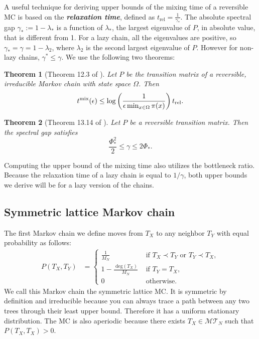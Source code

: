 \documentclass{article}
\newtheorem{theorem}{Theorem}
\begin{document}
A useful technique for deriving upper bounds of the mixing time of a reversible MC is based on the \textit{\textbf{relaxation time}}, defined as $t_{\text{rel}} = \frac{1}{\gamma_*}$. The absolute spectral gap $\gamma_{*}:=1-\lambda_{*}$ is a function of $\lambda_{*}$, the largest eigenvalue of $P$, in absolute value, that is different from 1. For a lazy chain, all the eigenvalues are positive, so $\gamma_* = \gamma=1-\lambda_{2}$, where $\lambda_{2}$ is the second largest eigenvalue of $P$. However for non-lazy chains, $\gamma^* \leq \gamma$. We use the following two theorems: 

\begin{theorem}[Theorem 12.3 of \cite{levin2017markov}] \label{thm:mix_rel_bound}
Let $P$ be the transition matrix of a reversible, irreducible Markov chain with state space $\Omega$. Then \[ t^{\textup{mix}}(\epsilon) \leq \log\left ( \frac{1}{\epsilon \min_{x\in\Omega} \pi(x)} \right) t_{\textup{rel}}. \]
\end{theorem}

\begin{theorem}[Theorem 13.14 of \cite{levin2017markov}] \label{thm:bottleneck_rel_bound}
Let $P$ be a reversible transition matrix. Then the spectral gap satisfies \[ \frac{\Phi_*^2}{2}\leq \gamma \leq 2\Phi_*. \]
\end{theorem}
\noindent Computing the upper bound of the mixing time also utilizes the bottleneck ratio. Because the relaxation time of a lazy chain is equal to $1/\gamma$, both upper bounds we derive will be for a lazy version of the chains.

\subsection{Symmetric lattice Markov chain}

The first Markov chain we define moves from $T_{X}$ to any neighbor $T_{Y}$ with equal probability as follows: 
\begin{align*}
    P(T_X, T_Y) &= \begin{cases} \frac{1}{M_N} & \text{ if } T_X \prec T_{Y} \text{ or } T_Y \prec T_{X}, \\
    1-\frac{\text{ deg}(T_{X})}{M_{N}} & \text{ if } T_{Y}=T_{X},\\
    0 & \text{ otherwise}. \end{cases}
\end{align*}
We call this Markov chain the symmetric lattice MC. It is symmetric by definition and irreducible because you can always trace a path between any two trees through their least upper bound. Therefore it has a uniform stationary distribution. The MC is also aperiodic because there exists $T_X \in \mathcal{MT}_N$ such that $P(T_X, T_X) >0$. \\
\end{document}
